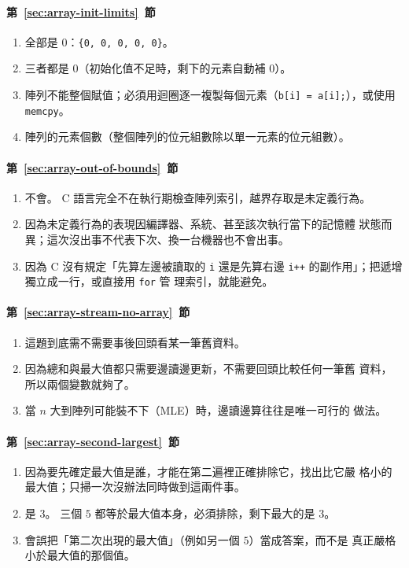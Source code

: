 \paragraph{第~\ref{sec:array-init-limits}~節}
\begin{enumerate}
\item 全部是 $0$：\texttt{\{0, 0, 0, 0, 0\}}。
\item 三者都是 $0$（初始化值不足時，剩下的元素自動補 $0$）。
\item 陣列不能整個賦值；必須用迴圈逐一複製每個元素（\texttt{b[i] =
a[i];}），或使用 \texttt{memcpy}。
\item 陣列的元素個數（整個陣列的位元組數除以單一元素的位元組數）。
\end{enumerate}

\paragraph{第~\ref{sec:array-out-of-bounds}~節}
\begin{enumerate}
\item 不會。 C 語言完全不在執行期檢查陣列索引，越界存取是未定義行為。
\item 因為未定義行為的表現因編譯器、系統、甚至該次執行當下的記憶體
狀態而異；這次沒出事不代表下次、換一台機器也不會出事。
\item 因為 C 沒有規定「先算左邊被讀取的 \texttt{i} 還是先算右邊
\texttt{i++} 的副作用」；把遞增獨立成一行，或直接用 \texttt{for} 管
理索引，就能避免。
\end{enumerate}

\paragraph{第~\ref{sec:array-stream-no-array}~節}
\begin{enumerate}
\item 這題到底需不需要事後回頭看某一筆舊資料。
\item 因為總和與最大值都只需要邊讀邊更新，不需要回頭比較任何一筆舊
資料，所以兩個變數就夠了。
\item 當 $n$ 大到陣列可能裝不下（MLE）時，邊讀邊算往往是唯一可行的
做法。
\end{enumerate}

\paragraph{第~\ref{sec:array-second-largest}~節}
\begin{enumerate}
\item 因為要先確定最大值是誰，才能在第二遍裡正確排除它，找出比它嚴
格小的最大值；只掃一次沒辦法同時做到這兩件事。
\item 是 $3$。 三個 $5$ 都等於最大值本身，必須排除，剩下最大的是 $3$。
\item 會誤把「第二次出現的最大值」（例如另一個 $5$）當成答案，而不是
真正嚴格小於最大值的那個值。
\end{enumerate}

